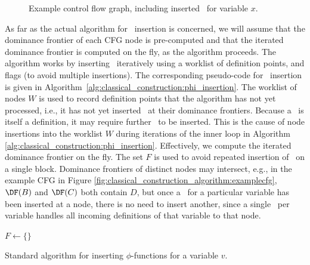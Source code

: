 {\begin{figure}
\caption{\label{fig:classical_construction_algorithm:examplecfg_varx}Example control flow graph, including
inserted \phifuns\ for variable $x$.
}
\end{figure}



As far as the actual algorithm for \phifuns\ insertion
is concerned, we will assume that the dominance
frontier of each CFG node is pre-computed and that the iterated dominance 
frontier is computed on the fly, as the algorithm proceeds.
The algorithm works by inserting \phifuns\ iteratively
using a worklist of definition points, and flags (to avoid multiple
insertions). The corresponding pseudo-code for
\phifun\ insertion is given in
Algorithm~\ref{alg:classical_construction:phi_insertion}.
%
The worklist of nodes $W$ is used to record definition points that the
algorithm
has not yet processed, i.e., it has not yet inserted \phifuns\ at their dominance
frontiers.
Because a \phifun\ is itself a 
definition, it may require further \phifuns\ to be inserted.
This is the cause of node insertions into the worklist $W$ during
iterations of the inner loop in Algorithm 
\ref{alg:classical_construction:phi_insertion}.
Effectively, we compute the iterated dominance frontier on the fly.
%
The set $F$ is used to avoid repeated insertion of \phifuns\
on a single block. Dominance
frontiers
of distinct nodes may intersect, e.g., in the example CFG in Figure
\ref{fig:classical_construction_algorithm:examplecfg},
$\DF(B)$ and $\DF(C)$ both contain $D$, but
once a \phifun\ for a particular variable has been
inserted at a node,
there is no need to insert another, since a single \phifun\ per
variable handles all incoming definitions of that variable to that node.


\begin{algorithm}[h]
  $F \leftarrow \{ \}$
\caption{\label{alg:classical_construction:phi_insertion}Standard algorithm for 
inserting $\phi$-functions for  a variable $v$.}
\end{algorithm}

}

